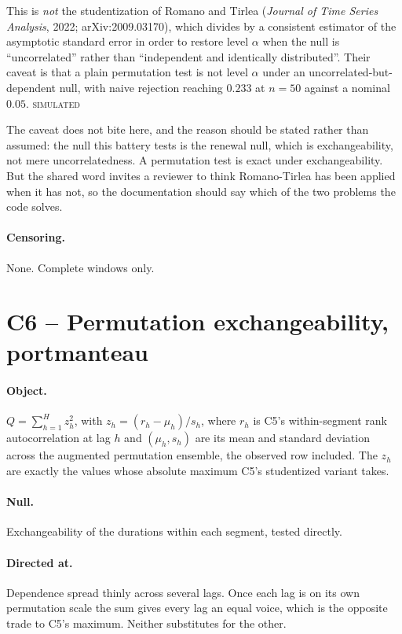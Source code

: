 \documentclass[11pt,a4paper]{article}
\newcommand{\SIMULATED}{\textsc{\textcolor{orange!70!black}{simulated}}}
\begin{document}
This is \emph{not} the studentization of Romano and Tirlea (\emph{Journal of Time Series
Analysis}, 2022; arXiv:2009.03170), which divides by a consistent estimator of the
asymptotic standard error in order to restore level $\alpha$ when the null is
\enquote{uncorrelated} rather than \enquote{independent and identically distributed}.
Their caveat is that a plain permutation test is not level $\alpha$ under an
uncorrelated-but-dependent null, with naive rejection reaching $0.233$ at $n = 50$
against a nominal $0.05$. \SIMULATED

\medskip
\noindent
The caveat does not bite here, and the reason should be stated rather than assumed: the
null this battery tests is the renewal null, which is exchangeability, not mere
uncorrelatedness. A permutation test is exact under exchangeability. But the shared word
invites a reviewer to think Romano-Tirlea has been applied when it has not, so the
documentation should say which of the two problems the code solves.

\paragraph{Censoring.} None. Complete windows only.

\section{C6 -- Permutation exchangeability, portmanteau}

\paragraph{Object.} $Q = \sum_{h=1}^{H} z_h^2$, with $z_h = (r_h - \mu_h)/s_h$, where $r_h$
is C5's within-segment rank autocorrelation at lag $h$ and $(\mu_h, s_h)$ are its mean and
standard deviation across the augmented permutation ensemble, the observed row included.
The $z_h$ are exactly the values whose absolute maximum C5's studentized variant takes.

\paragraph{Null.} Exchangeability of the durations within each segment, tested directly.

\paragraph{Directed at.} Dependence spread thinly across several lags. Once each lag is on
its own permutation scale the sum gives every lag an equal voice, which is the opposite
trade to C5's maximum. Neither substitutes for the other.
\end{document}
